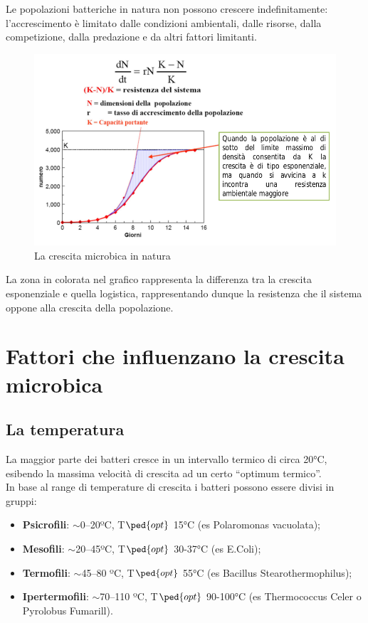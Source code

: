 \documentclass[11pt]{book}
\begin{document}
Le popolazioni batteriche in natura non possono crescere indefinitamente: l’accrescimento è limitato dalle condizioni ambientali, dalle risorse, dalla competizione, dalla predazione e da altri fattori limitanti.

\begin{figure}[htp]
\centering
\includegraphics[scale=0.4]{img/Crescita in natura.png}
\caption{La crescita microbica in natura}
\label{}
\end{figure}

La zona in colorata nel grafico rappresenta la differenza tra la crescita esponenziale e quella logistica, rappresentando dunque la resistenza che il sistema oppone alla crescita della popolazione.

\clearpage
\section{Fattori che influenzano la crescita microbica}
\subsection{La temperatura}
La maggior parte dei batteri cresce in un intervallo termico di circa 20°C, esibendo la massima velocità di crescita ad un certo “optimum termico”.\\
In base al range di temperature di crescita i batteri possono essere divisi in gruppi:
\begin{itemize}
\item \textbf{Psicrofili}: $\sim$0–20ºC, T$\ped{opt}$ 15°C (es Polaromonas vacuolata);
\item \textbf{Mesofili}: $\sim$20–45ºC, T$\ped{opt}$ 30-37°C (es E.Coli);
\item \textbf{Termofili}: $\sim$45–80 ºC, T$\ped{opt}$ 55°C (es Bacillus Stearothermophilus);
\item \textbf{Ipertermofili}: $\sim$70–110 ºC, T$\ped{opt}$ 90-100°C (es Thermococcus Celer o Pyrolobus Fumarill).
\end{itemize}
\end{document}
